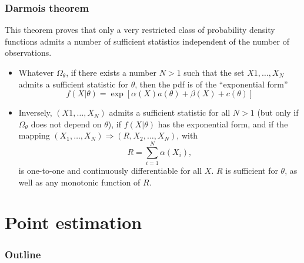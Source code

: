 \documentclass[9pt]{beamer}
\begin{document}
\begin{frame}
 \frametitle{Darmois theorem}
 
 This theorem proves that only a very restricted class of probability density functions admits a number of sufficient statistics independent of the number of observations.
 
 \begin{itemize}
  \item Whatever $\Omega_\theta$, if there exists a number $N>1$ such that the set $X1,\dots,X_N$ admits a sufficient statistic for $\theta$, then the pdf is of the ``exponential form''
  $$f(X|\theta) = \exp [ \alpha(X)a(\theta) + \beta(X) + c(\theta)]$$
  \item Inversely, $(X1,\dots,X_N)$ admits a sufficient statistic for all $N>1$ (but only if $\Omega_\theta$ does not depend on $\theta$), if $f(X|\theta)$ has the exponential form,
  and if the mapping $(X_1,\dots,X_N) \Rightarrow (R,X_2,\dots,X_N)$, with
  $$R = \sum_{i=1}^N \alpha(X_i),$$
  is one-to-one and continuously differentiable for all $X$. $R$ is sufficient for $\theta$, as well as any monotonic function of $R$.
 \end{itemize}

\end{frame}



\section{Point estimation}

\begin{frame}
 \frametitle{Outline}
 
 \tableofcontents[current]
\end{frame}
\end{document}
